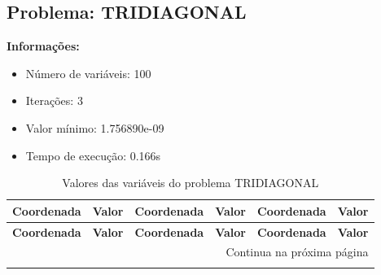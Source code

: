 \documentclass[12pt]{article}
\begin{document}
\newpage            
\subsection{Problema: TRIDIAGONAL}

\textbf{Informações:}
\begin{itemize}
\item Número de variáveis: 100
\item Iterações: 3
\item Valor mínimo: 1.756890e-09
\item Tempo de execução: 0.166s
\end{itemize}

\small
\begin{longtable}{@{}cc|cc|cc@{}}
\caption{Valores das variáveis do problema TRIDIAGONAL} \\
\toprule
\textbf{Coordenada} & \textbf{Valor} & \textbf{Coordenada} & \textbf{Valor} & \textbf{Coordenada} & \textbf{Valor} \\
\midrule
\endfirsthead

\toprule
\textbf{Coordenada} & \textbf{Valor} & \textbf{Coordenada} & \textbf{Valor} & \textbf{Coordenada} & \textbf{Valor} \\
\midrule
\endhead

\midrule \multicolumn{6}{r}{{Continua na próxima página}} \\ \midrule
\endfoot


\end{longtable}
\end{document}
